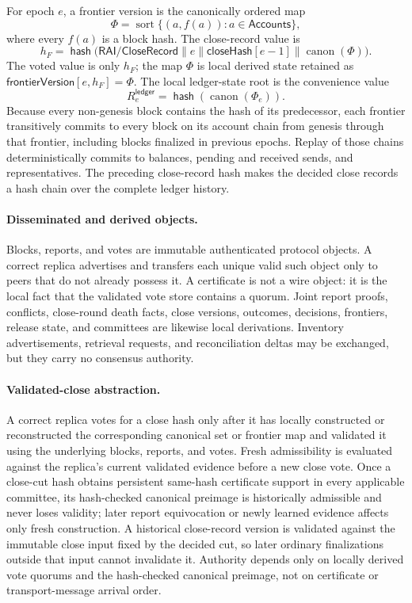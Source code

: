 \documentclass[sigplan,twocolumn,review,anonymous]{acmart}
\newcommand{\func}[1]{\operatorname{\mathsf{#1}}}
\newcommand{\hash}{\func{hash}}
\newcommand{\closeHash}{\mathsf{closeHash}}
\newcommand{\frontierVersion}{\mathsf{frontierVersion}}
\begin{document}
For epoch \(e\), a frontier version is the canonically ordered map
\[
\Phi=\operatorname{sort}\{(a,f(a)):a\in\mathsf{Accounts}\},
\]
where every \(f(a)\) is a block hash.  The close-record value is
\[
h_F=\hash\bigl(
\mathsf{RAI/CloseRecord}\parallel e\parallel\closeHash[e-1]
\parallel\operatorname{canon}(\Phi)
\bigr).
\]
The voted value is only \(h_F\); the map \(\Phi\) is local derived state retained as
\(\frontierVersion[e,h_F]=\Phi\).  The local ledger-state root is the convenience value
\[
R^{\mathsf{ledger}}_e=\hash(\operatorname{canon}(\Phi_e)).
\]
Because every non-genesis block contains the hash of its predecessor, each frontier transitively
commits to every block on its account chain from genesis through that frontier, including blocks
finalized in previous epochs.  Replay of those chains deterministically commits to balances, pending
and received sends, and representatives.  The preceding close-record hash makes the decided close
records a hash chain over the complete ledger history.

\paragraph{Disseminated and derived objects.}
Blocks, reports, and votes are immutable authenticated protocol objects.  A correct replica advertises
and transfers each unique valid such object only to peers that do not already possess it.  A certificate
is not a wire object: it is the local fact that the validated vote store contains a quorum.  Joint report
proofs, conflicts, close-round death facts, close versions, outcomes, decisions, frontiers, release
state, and committees are likewise local derivations.  Inventory advertisements, retrieval requests,
and reconciliation deltas may be exchanged, but they carry no consensus authority.

\paragraph{Validated-close abstraction.}
A correct replica votes for a close hash only after it has locally constructed or reconstructed the
corresponding canonical set or frontier map and validated it using the underlying blocks, reports, and
votes.  Fresh admissibility is evaluated against the replica's current validated evidence before a new
close vote.  Once a close-cut hash obtains persistent same-hash certificate support in every applicable committee,
its hash-checked canonical preimage is historically admissible and never loses validity;
later report equivocation or newly learned evidence affects only fresh construction.  A historical
close-record version is validated against the immutable close input fixed by the decided cut, so later
ordinary finalizations outside that input cannot invalidate it.  Authority depends only on locally
derived vote quorums and the hash-checked canonical preimage, not on certificate or transport-message
arrival order.
\end{document}
